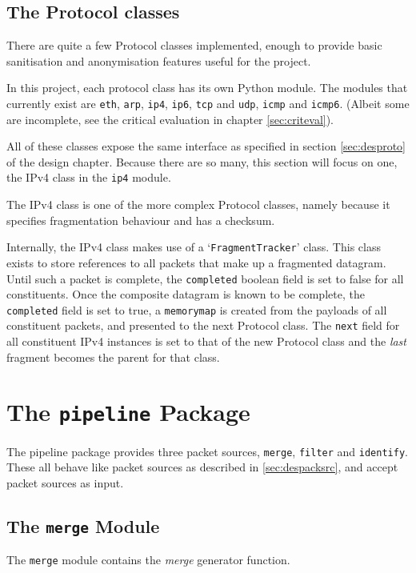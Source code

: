 \documentclass[10pt,a4paper,notitlepage]{report}
\begin{document}
\subsection{The Protocol classes}
There are quite a few Protocol classes implemented, enough to provide basic sanitisation and anonymisation features useful for the project.

In this project, each protocol class has its own Python module. The modules that currently exist are \texttt{eth}, \texttt{arp}, \texttt{ip4}, \texttt{ip6}, \texttt{tcp} and \texttt{udp}, \texttt{icmp} and \texttt{icmp6}. (Albeit some are incomplete, see the critical evaluation in chapter \ref{sec:criteval}).

All of these classes expose the same interface as specified in section \ref{sec:desproto} of the design chapter. Because there are so many, this section will focus on one, the IPv4 class in the \texttt{ip4} module.

The IPv4 class is one of the more complex Protocol classes, namely because it specifies fragmentation behaviour and has a checksum.

Internally, the IPv4 class makes use of a `\texttt{FragmentTracker}' class. This class exists to store references to all packets that make up a fragmented datagram. Until such a packet is complete, the \texttt{completed} boolean field is set to false for all constituents. Once the composite datagram is known to be complete, the \texttt{completed} field is set to true, a \texttt{memorymap} is created from the payloads of all constituent packets, and presented to the next Protocol class. The \texttt{next} field for all constituent IPv4 instances is set to that of the new Protocol class and the \emph{last} fragment becomes the parent for that class.


\section{The \texttt{pipeline} Package}
The pipeline package provides three packet sources, \texttt{merge}, \texttt{filter} and \texttt{identify}.
These all behave like packet sources as described in \ref{sec:despacksrc}, and accept packet sources as input.

\subsection{The \texttt{merge} Module}
The \texttt{merge} module contains the \emph{merge} generator function.
\end{document}
